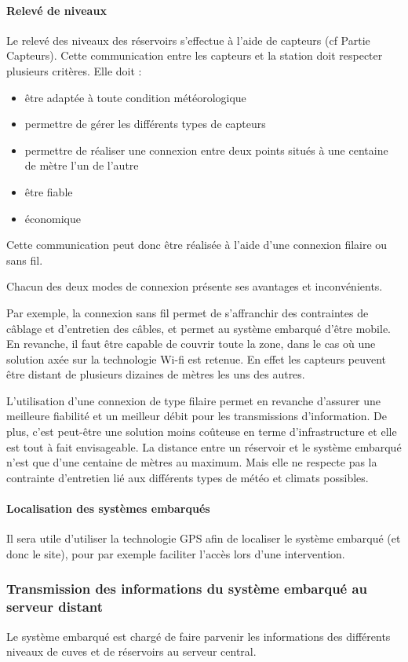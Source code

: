 \documentclass{article}
\begin{document}
\paragraph{Relevé de niveaux}
Le relevé des niveaux des réservoirs s’effectue à l’aide de capteurs (cf
Partie Capteurs). Cette communication entre les capteurs et la station
doit respecter plusieurs critères. Elle doit : 

\begin{itemize}
\item être adaptée à toute condition météorologique
\item permettre de gérer les différents types de capteurs
\item permettre de réaliser une connexion entre deux points situés à une
centaine de mètre l’un de l’autre
\item être fiable
\item économique
\end{itemize}
Cette communication peut donc être réalisée à l’aide d’une connexion
filaire ou sans fil.

Chacun des deux modes de connexion présente ses avantages et
inconvénients. 

Par exemple, la connexion sans fil permet de s’affranchir des
contraintes de câblage et d'entretien des câbles, et
permet au système embarqué d’être mobile. En revanche, il faut être
capable de couvrir toute la zone, dans le cas où une solution axée sur
la technologie Wi-fi est retenue. En effet les capteurs peuvent être
distant de plusieurs dizaines de mètres les uns des autres.

L’utilisation d’une connexion de type filaire permet en revanche
d’assurer une meilleure fiabilité et un meilleur débit pour les
transmissions d’information. De plus, c’est peut-être une solution
moins coûteuse en terme d’infrastructure et elle est tout à fait
envisageable. La distance entre un réservoir et le système embarqué
n’est que d’une centaine de mètres au maximum. Mais elle ne respecte
pas la contrainte d’entretien lié aux différents types de météo et
climats possibles.

\paragraph{Localisation des systèmes embarqués}
Il sera utile d’utiliser la technologie GPS afin de localiser le système
embarqué (et donc le site), pour par exemple faciliter l’accès lors
d’une intervention. 

\subsubsection{Transmission des informations du système embarqué au serveur
distant}
Le système embarqué est chargé de faire parvenir les informations des
différents niveaux de cuves et de réservoirs au serveur central. 
\end{document}
